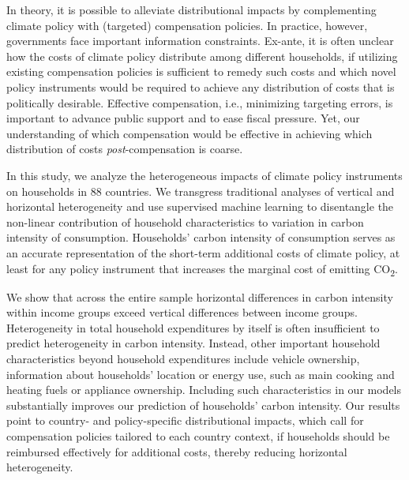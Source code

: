 \documentclass[12pt, a4paper]{article}
\begin{document}
In theory, it is possible to alleviate distributional impacts by complementing climate policy with (targeted) compensation policies. In practice, however, governments face important information constraints. Ex-ante, it is often unclear how the costs of climate policy distribute among different households, if utilizing existing compensation policies is sufficient to remedy such costs and which novel policy instruments would be required to achieve any distribution of costs that is politically desirable. Effective compensation, i.e., minimizing targeting errors, is important to advance public support and to ease fiscal pressure. Yet, our understanding of which compensation would be effective in achieving which distribution of costs \textit{post}-compensation is coarse.

In this study, we analyze the heterogeneous impacts of climate policy instruments on households in 88 countries. We transgress traditional analyses of vertical and horizontal heterogeneity and use supervised machine learning to disentangle the non-linear contribution of household characteristics to variation in carbon intensity of consumption. Households' carbon intensity of consumption serves as an accurate representation of the short-term additional costs of climate policy, at least for any policy instrument that increases the marginal cost of emitting CO\textsubscript{2}.

We show that across the entire sample horizontal differences in carbon intensity within income groups exceed vertical differences between income groups. Heterogeneity in total household expenditures by itself is often insufficient to predict heterogeneity in carbon intensity. Instead, other important household characteristics beyond household expenditures include vehicle ownership, information about households' location or energy use, such as main cooking and heating fuels or appliance ownership. Including such characteristics in our models substantially improves our prediction of households' carbon intensity. Our results point to country- and policy-specific distributional impacts, which call for compensation policies tailored to each country context, if households should be reimbursed effectively for additional costs, thereby reducing horizontal heterogeneity. 
\end{document}
